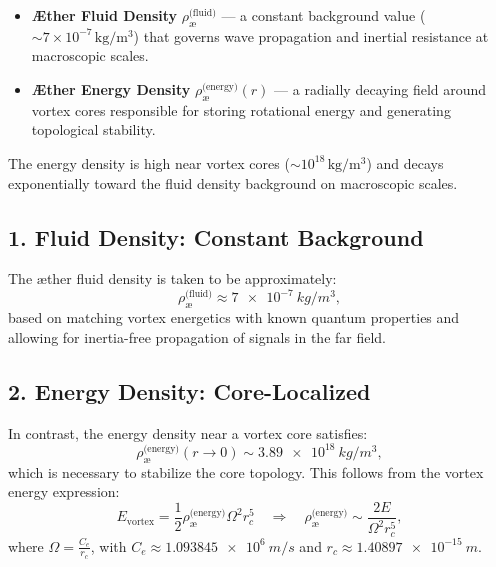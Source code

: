 \begin{itemize}
    \item \textbf{Æther Fluid Density} \(\rho_{\text{\ae}}^{\text{(fluid)}}\) — a constant background value (\(\sim 7 \times 10^{-7}\, \mathrm{kg/m^3}\)) that governs wave propagation and inertial resistance at macroscopic scales.
    \item \textbf{Æther Energy Density} \(\rho_{\text{\ae}}^{\text{(energy)}}(r)\) — a radially decaying field around vortex cores responsible for storing rotational energy and generating topological stability.
\end{itemize}

The energy density is high near vortex cores (\(\sim 10^{18}\, \mathrm{kg/m^3}\)) and decays exponentially toward the fluid density background on macroscopic scales.


\subsection*{1. Fluid Density: Constant Background}

The æther fluid density is taken to be approximately:
\begin{equation}
    \rho_{\text{\ae}}^{\text{(fluid)}} \approx \SI{7e-7}{kg/m^3},
\end{equation}
based on matching vortex energetics with known quantum properties and allowing for inertia-free propagation of signals in the far field.

\subsection*{2. Energy Density: Core-Localized}

In contrast, the energy density near a vortex core satisfies:
\begin{equation}
    \rho_{\text{\ae}}^{\text{(energy)}}(r \to 0) \sim \SI{3.89e18}{kg/m^3},
\end{equation}
which is necessary to stabilize the core topology. This follows from the vortex energy expression:
\begin{equation}
    E_{\text{vortex}} = \frac{1}{2} \rho_{\text{\ae}}^{\text{(energy)}} \Omega^2 r_c^5
    \quad\Rightarrow\quad
    \rho_{\text{\ae}}^{\text{(energy)}} \sim \frac{2E}{\Omega^2 r_c^5},
\end{equation}
where \( \Omega = \frac{C_e}{r_c} \), with \( C_e \approx \SI{1.093845e6}{m/s} \) and \( r_c \approx \SI{1.40897e-15}{m} \).

